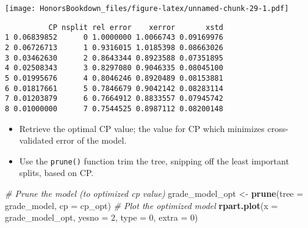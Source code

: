 \documentclass[
]{book}
\newenvironment{Shaded}{\begin{snugshade}}{\end{snugshade}}
\newcommand{\CommentTok}[1]{\textcolor[rgb]{0.56,0.35,0.01}{\textit{#1}}}
\newcommand{\DataTypeTok}[1]{\textcolor[rgb]{0.13,0.29,0.53}{#1}}
\newcommand{\DecValTok}[1]{\textcolor[rgb]{0.00,0.00,0.81}{#1}}
\newcommand{\KeywordTok}[1]{\textcolor[rgb]{0.13,0.29,0.53}{\textbf{#1}}}
\newcommand{\NormalTok}[1]{#1}
\newcommand{\OperatorTok}[1]{\textcolor[rgb]{0.81,0.36,0.00}{\textbf{#1}}}
\newcommand{\StringTok}[1]{\textcolor[rgb]{0.31,0.60,0.02}{#1}}
\providecommand{\tightlist}{%
  \setlength{\itemsep}{0pt}\setlength{\parskip}{0pt}}
\begin{document}
\texttt{[image: HonorsBookdown\_files/figure-latex/unnamed-chunk-29-1.pdf]}

\begin{Shaded}
\end{Shaded}

\begin{verbatim}
          CP nsplit rel error    xerror       xstd
1 0.06839852      0 1.0000000 1.0066743 0.09169976
2 0.06726713      1 0.9316015 1.0185398 0.08663026
3 0.03462630      2 0.8643344 0.8923588 0.07351895
4 0.02508343      3 0.8297080 0.9046335 0.08045100
5 0.01995676      4 0.8046246 0.8920489 0.08153881
6 0.01817661      5 0.7846679 0.9042142 0.08283114
7 0.01203879      6 0.7664912 0.8833557 0.07945742
8 0.01000000      7 0.7544525 0.8987112 0.08200148
\end{verbatim}

\begin{itemize}
\tightlist
\item
  Retrieve the optimal CP value; the value for CP which minimizes cross-validated error of the model.
\end{itemize}

\begin{Shaded}
\end{Shaded}

\begin{itemize}
\tightlist
\item
  Use the \texttt{prune()} function trim the tree, snipping off the least important splits, based on CP.
\end{itemize}

\begin{Shaded}
\begin{Highlighting}[]
\CommentTok{# Prune the model (to optimized cp value)}
\NormalTok{grade_model_opt <-}\StringTok{ }\KeywordTok{prune}\NormalTok{(}\DataTypeTok{tree =}\NormalTok{ grade_model, }
                         \DataTypeTok{cp =}\NormalTok{ cp_opt)}
\CommentTok{# Plot the optimized model}
\KeywordTok{rpart.plot}\NormalTok{(}\DataTypeTok{x =}\NormalTok{ grade_model_opt, }\DataTypeTok{yesno =} \DecValTok{2}\NormalTok{, }\DataTypeTok{type =} \DecValTok{0}\NormalTok{, }\DataTypeTok{extra =} \DecValTok{0}\NormalTok{)}
\end{Highlighting}
\end{Shaded}
\end{document}
